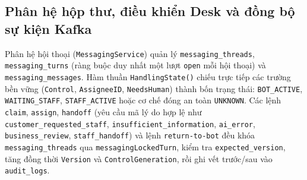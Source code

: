 \subsection{Phân hệ hộp thư, điều khiển Desk và đồng bộ sự kiện Kafka}
Phân hệ hội thoại (\texttt{MessagingService}) quản lý \texttt{messaging\_\hspace{0pt}threads}, \texttt{messaging\_\hspace{0pt}turns} (ràng buộc duy nhất một lượt \texttt{open} mỗi hội thoại) và
\texttt{messaging\_\hspace{0pt}messages}.
Hàm thuần \texttt{Handling\hspace{0pt}State()} chiếu trực tiếp các trường bền vững (\texttt{Control}, \texttt{Assignee\hspace{0pt}ID}, \texttt{Needs\hspace{0pt}Human}) thành bốn trạng thái: \texttt{BOT\_\hspace{0pt}ACTIVE},
\texttt{WAITING\_\hspace{0pt}STAFF}, \texttt{STAFF\_\hspace{0pt}ACTIVE} hoặc cơ chế đóng an toàn \texttt{UNKNOWN}.
Các lệnh \texttt{claim}, \texttt{assign}, \texttt{handoff} (yêu cầu mã lý do hợp lệ như \texttt{customer\_\hspace{0pt}requested\_\hspace{0pt}staff}, \texttt{insufficient\_\hspace{0pt}information},
\texttt{ai\_\hspace{0pt}error}, \texttt{business\_\hspace{0pt}review}, \texttt{staff\_\hspace{0pt}handoff}) và lệnh \texttt{return-\hspace{0pt}to-\hspace{0pt}bot} đều khóa \texttt{messaging\_\hspace{0pt}threads} qua \texttt{messagingLockedTurn}, kiểm
tra \texttt{expected\_\hspace{0pt}version}, tăng đồng thời \texttt{Version} và \texttt{Control\hspace{0pt}Generation}, rồi ghi vết trước/sau vào \texttt{audit\_\hspace{0pt}logs}.

